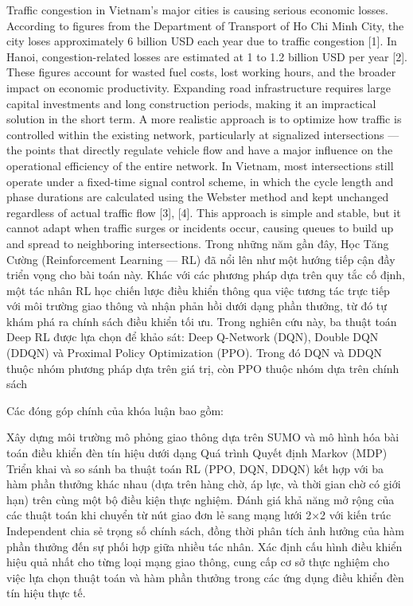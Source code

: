 Traffic congestion in Vietnam's major cities is causing serious economic losses. According to figures from the Department of Transport of Ho Chi Minh City, the city loses approximately 6 billion USD  each year due to traffic congestion [1]. In Hanoi, congestion-related losses are estimated at 1 to 1.2 billion USD per year [2]. These figures account for wasted fuel costs, lost working hours, and the broader impact on economic productivity.
Expanding road infrastructure requires large capital investments and long construction periods, making it an impractical solution in the short term. A more realistic approach is to optimize how traffic is controlled within the existing network, particularly at signalized intersections — the points that directly regulate vehicle flow and have a major influence on the operational efficiency of the entire network.
In Vietnam, most intersections still operate under a fixed-time signal control scheme, in which the cycle length and phase durations are calculated using the Webster method and kept unchanged regardless of actual traffic flow [3], [4]. This approach is simple and stable, but it cannot adapt when traffic surges or incidents occur, causing queues to build up and spread to neighboring intersections.
Trong những năm gần đây, Học Tăng Cường (Reinforcement Learning — RL) đã nổi lên như một hướng tiếp cận đầy triển vọng cho bài toán này. Khác với các phương pháp dựa trên quy tắc cố định, một tác nhân RL học chiến lược điều khiển thông qua việc tương tác trực tiếp với môi trường giao thông và nhận phản hồi dưới dạng phần thưởng, từ đó tự khám phá ra chính sách điều khiển tối ưu. 
Trong nghiên cứu này, ba thuật toán Deep RL được lựa chọn để khảo sát: Deep Q-Network (DQN), Double DQN (DDQN) và Proximal Policy Optimization (PPO). Trong đó DQN và DDQN thuộc nhóm phương pháp dựa trên giá trị, còn PPO thuộc nhóm dựa trên chính sách

Các đóng góp chính của khóa luận bao gồm:

Xây dựng môi trường mô phỏng giao thông dựa trên SUMO và mô hình hóa bài toán điều khiển đèn tín hiệu dưới dạng Quá trình Quyết định Markov (MDP) 
Triển khai và so sánh ba thuật toán RL (PPO, DQN, DDQN) kết hợp với ba hàm phần thưởng khác nhau (dựa trên hàng chờ, áp lực, và thời gian chờ có giới hạn) trên cùng một bộ điều kiện thực nghiệm.
Đánh giá khả năng mở rộng của các thuật toán khi chuyển từ nút giao đơn lẻ sang mạng lưới 2×2 với kiến trúc Independent chia sẻ trọng số chính sách, đồng thời phân tích ảnh hưởng của hàm phần thưởng đến sự phối hợp giữa nhiều tác nhân.
Xác định cấu hình điều khiển hiệu quả nhất cho từng loại mạng giao thông, cung cấp cơ sở thực nghiệm cho việc lựa chọn thuật toán và hàm phần thưởng trong các ứng dụng điều khiển đèn tín hiệu thực tế.
